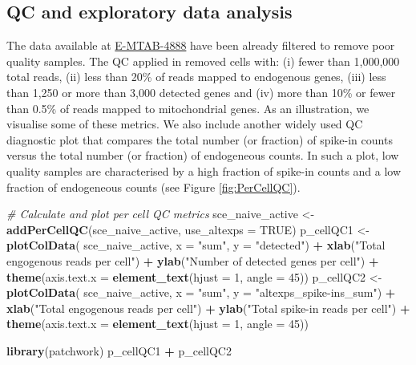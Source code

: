 \documentclass[9pt,a4paper,]{extarticle}
\newenvironment{Shaded}{\begin{snugshade}}{\end{snugshade}}
\newcommand{\CommentTok}[1]{\textcolor[rgb]{0.56,0.35,0.01}{\textit{#1}}}
\newcommand{\DataTypeTok}[1]{\textcolor[rgb]{0.13,0.29,0.53}{#1}}
\newcommand{\DecValTok}[1]{\textcolor[rgb]{0.00,0.00,0.81}{#1}}
\newcommand{\KeywordTok}[1]{\textcolor[rgb]{0.13,0.29,0.53}{\textbf{#1}}}
\newcommand{\NormalTok}[1]{#1}
\newcommand{\OperatorTok}[1]{\textcolor[rgb]{0.81,0.36,0.00}{\textbf{#1}}}
\newcommand{\OtherTok}[1]{\textcolor[rgb]{0.56,0.35,0.01}{#1}}
\newcommand{\StringTok}[1]{\textcolor[rgb]{0.31,0.60,0.02}{#1}}
\begin{document}
\hypertarget{qc-and-exploratory-data-analysis-1}{%
\subsection{QC and exploratory data analysis}\label{qc-and-exploratory-data-analysis-1}}

The data available at
\href{https://www.ebi.ac.uk/arrayexpress/experiments/E-MTAB-4888/}{E-MTAB-4888} have
been already filtered to remove poor quality samples.
The QC applied in \citep{Martinez-jimenez2017} removed cells with: (i) fewer
than 1,000,000 total reads, (ii) less than 20\% of reads mapped to
endogenous genes, (iii) less than 1,250 or more than 3,000 detected genes and
(iv) more than 10\% or fewer than 0.5\% of reads mapped to mitochondrial genes.
As an illustration, we visualise some of these metrics.
We also include another widely used QC diagnostic plot that compares the total
number (or fraction) of spike-in counts versus the total number (or fraction) of
endogeneous counts.
In such a plot, low quality samples are characterised by a high fraction of
spike-in counts and a low fraction of endogeneous counts
(see Figure \ref{fig:PerCellQC}).

\begin{Shaded}
\begin{Highlighting}[]
\CommentTok{# Calculate and plot per cell QC metrics}
\NormalTok{sce_naive_active <-}\StringTok{ }\KeywordTok{addPerCellQC}\NormalTok{(sce_naive_active, }\DataTypeTok{use_altexps =} \OtherTok{TRUE}\NormalTok{)}
\NormalTok{p_cellQC1 <-}\StringTok{ }\KeywordTok{plotColData}\NormalTok{(}
\NormalTok{  sce_naive_active, }
  \DataTypeTok{x =} \StringTok{"sum"}\NormalTok{, }
  \DataTypeTok{y =} \StringTok{"detected"}\NormalTok{) }\OperatorTok{+}
\StringTok{  }\KeywordTok{xlab}\NormalTok{(}\StringTok{"Total engogenous reads per cell"}\NormalTok{) }\OperatorTok{+}
\StringTok{  }\KeywordTok{ylab}\NormalTok{(}\StringTok{"Number of detected genes per cell"}\NormalTok{) }\OperatorTok{+}
\StringTok{  }\KeywordTok{theme}\NormalTok{(}\DataTypeTok{axis.text.x =} \KeywordTok{element_text}\NormalTok{(}\DataTypeTok{hjust =} \DecValTok{1}\NormalTok{, }\DataTypeTok{angle =} \DecValTok{45}\NormalTok{))}
\NormalTok{p_cellQC2 <-}\StringTok{ }\KeywordTok{plotColData}\NormalTok{(}
\NormalTok{  sce_naive_active, }
  \DataTypeTok{x =} \StringTok{"sum"}\NormalTok{, }
  \DataTypeTok{y =} \StringTok{"altexps_spike-ins_sum"}\NormalTok{) }\OperatorTok{+}
\StringTok{  }\KeywordTok{xlab}\NormalTok{(}\StringTok{"Total engogenous reads per cell"}\NormalTok{) }\OperatorTok{+}
\StringTok{  }\KeywordTok{ylab}\NormalTok{(}\StringTok{"Total spike-in reads per cell"}\NormalTok{) }\OperatorTok{+}
\StringTok{  }\KeywordTok{theme}\NormalTok{(}\DataTypeTok{axis.text.x =} \KeywordTok{element_text}\NormalTok{(}\DataTypeTok{hjust =} \DecValTok{1}\NormalTok{, }\DataTypeTok{angle =} \DecValTok{45}\NormalTok{))}

\KeywordTok{library}\NormalTok{(patchwork)}
\NormalTok{p_cellQC1 }\OperatorTok{+}\StringTok{ }\NormalTok{p_cellQC2}
\end{Highlighting}
\end{Shaded}
\end{document}
